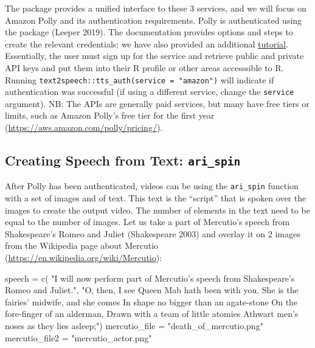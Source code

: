 The  package provides a unified interface to these 3
services, and we will focus on Amazon Polly and its authentication
requirements. Polly is authenticated using the 
package (Leeper 2019). The  documentation provides
options and steps to create the relevant credentials; we have also
provided an additional
\href{http://seankross.com/2017/05/02/Access-Amazon-Web-Services-in-R.html}{tutorial}.
Essentially, the user must sign up for the service and retrieve public
and private API keys and put them into their R profile or other areas
accesssible to R. Running
\texttt{text2speech::tts\_auth(service\ =\ "amazon")} will indicate if
authentication was successful (if using a different service, change the
\texttt{service} argument). NB: The APIs are generally paid services,
but many have free tiers or limits, such as Amazon Polly's free tier for
the first year (\url{https://aws.amazon.com/polly/pricing/}).

\hypertarget{creating-speech-from-text-ari_spin}{%
\subsection{\texorpdfstring{Creating Speech from Text:
\texttt{ari\_spin}}{Creating Speech from Text: ari\_spin}}\label{creating-speech-from-text-ari_spin}}

After Polly has been authenticated, videos can be using the
\texttt{ari\_spin} function with a set of images and of text. This text
is the ``script'' that is spoken over the images to create the output
video. The number of elements in the text need to be equal to the number
of images. Let us take a part of Mercutio's speech from Shakespeare's
Romeo and Juliet (Shakespeare 2003) and overlay it on 2 images from the
Wikipedia page about Mercutio
(\url{https://en.wikipedia.org/wiki/Mercutio}):

\begin{Schunk}
\begin{Sinput}
speech =  c(
  "I will now perform part of Mercutio's speech from Shakespeare's Romeo and Juliet.", 
  "O, then, I see Queen Mab hath been with you.
   She is the fairies' midwife, and she comes
   In shape no bigger than an agate-stone
   On the fore-finger of an alderman,
   Drawn with a team of little atomies
   Athwart men's noses as they lies asleep;")
mercutio_file = "death_of_mercutio.png"
mercutio_file2 = "mercutio_actor.png"
\end{Sinput}
\end{Schunk}

